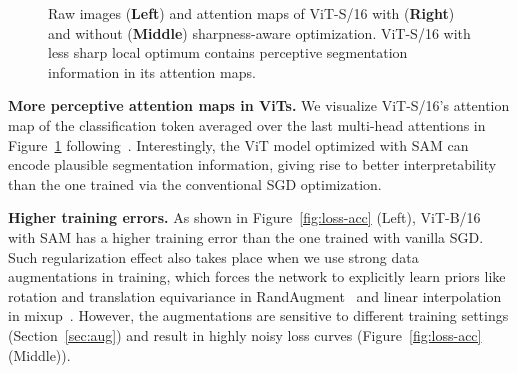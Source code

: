 \documentclass{article}
\newcommand{\BG}[1]{\textcolor{blue}{Boqing: #1}}
\begin{document}
\begin{figure}
\vspace{-5pt}
\caption{Raw images (\textbf{Left}) and attention maps of ViT-S/16 with (\textbf{Right}) and without (\textbf{Middle}) sharpness-aware optimization. ViT-S/16 with less sharp local optimum contains perceptive segmentation information in its attention maps.
}
\vspace{-10pt}
\label{fig:attn}
\end{figure}

\textbf{More perceptive attention maps in ViTs.} We visualize ViT-S/16's attention map of the classification token averaged over the last multi-head attentions in Figure~\ref{fig:attn} following~\citet{caron2021emerging}.
Interestingly, the ViT model optimized with SAM can encode plausible segmentation information, giving rise to better interpretability than the one trained via the conventional SGD optimization.

\textbf{Higher training errors.}
As shown in Figure~\ref{fig:loss-acc} (Left), ViT-B/16 with SAM has a higher training error than the one trained with vanilla SGD.
Such regularization effect also takes place when we use strong data augmentations in training, which forces the network to explicitly learn priors like rotation and translation equivariance in RandAugment~\cite{cubuk2019randaugment} and linear interpolation in mixup~\cite{zhang2018mixup}.
However, the augmentations are sensitive to different training settings (Section~\ref{sec:aug}) and result in highly noisy loss curves (Figure~\ref{fig:loss-acc} (Middle)). %


\end{document}
